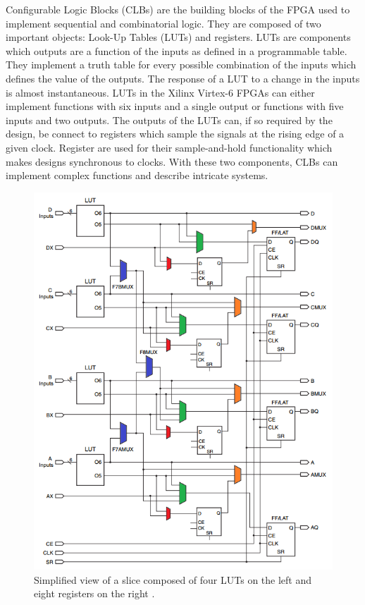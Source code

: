       Configurable Logic Blocks (CLBs) \cite{VIRTEX-CLB} are the building blocks of the FPGA used to implement sequential and combinatorial logic. They are composed of two important objects: Look-Up Tables (LUTs) and registers. LUTs are components which outputs are a function of the inputs as defined in a programmable table. They implement a truth table for every possible combination of the inputs which defines the value of the outputs. The response of a LUT to a change in the inputs is almost instantaneous. LUTs in the Xilinx Virtex-6 FPGAs can either implement functions with six inputs and a single output or functions with five inputs and two outputs. The outputs of the LUTs can, if so required by the design, be connect to registers which sample the signals at the rising edge of a given clock. Register are used for their sample-and-hold functionality which makes designs synchronous to clocks. With these two components, CLBs can implement complex functions and describe intricate systems. \\

      \begin{figure}[p!]
        \centering
        \includegraphics[width=\textwidth]{img/II-6-irradiation/clb.png}
        \caption{Simplified view of a slice composed of four LUTs on the left and eight registers on the right \cite{VIRTEX-CLB}.}
        \label{fig:II-6-clb}
      \end{figure}

